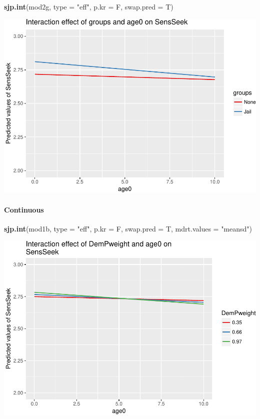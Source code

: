 \documentclass[]{article}
\newenvironment{Shaded}{\begin{snugshade}}{\end{snugshade}}
\newcommand{\KeywordTok}[1]{\textcolor[rgb]{0.13,0.29,0.53}{\textbf{{#1}}}}
\newcommand{\DataTypeTok}[1]{\textcolor[rgb]{0.13,0.29,0.53}{{#1}}}
\newcommand{\StringTok}[1]{\textcolor[rgb]{0.31,0.60,0.02}{{#1}}}
\newcommand{\NormalTok}[1]{{#1}}
\let\oldparagraph\paragraph
\renewcommand{\paragraph}[1]{\oldparagraph{#1}\mbox{}}
\begin{document}
\begin{Shaded}
\begin{Highlighting}[]
\KeywordTok{sjp.int}\NormalTok{(mod2g, }\DataTypeTok{type =} \StringTok{"eff"}\NormalTok{, }\DataTypeTok{p.kr =} \NormalTok{F, }\DataTypeTok{swap.pred =} \NormalTok{T)}
\end{Highlighting}
\end{Shaded}

\includegraphics{Conditional_Models_doc_files/figure-latex/unnamed-chunk-29-1.pdf}

\paragraph{Continuous}\label{continuous}

\small

\begin{Shaded}
\begin{Highlighting}[]
\KeywordTok{sjp.int}\NormalTok{(mod1b, }\DataTypeTok{type =} \StringTok{"eff"}\NormalTok{, }\DataTypeTok{p.kr =} \NormalTok{F, }\DataTypeTok{swap.pred =} \NormalTok{T, }\DataTypeTok{mdrt.values =} \StringTok{"meansd"}\NormalTok{)}
\end{Highlighting}
\end{Shaded}

\includegraphics{Conditional_Models_doc_files/figure-latex/unnamed-chunk-30-1.pdf}
\end{document}
